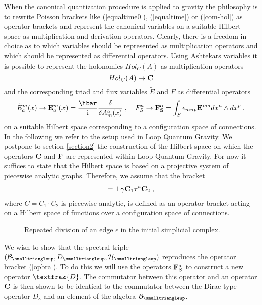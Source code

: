 \documentclass[12pt]{article}
\newcommand{\ba}{\begin{eqnarray}}
\newcommand{\ea}{\end{eqnarray}}
\def\d{\delta}
\def\e{\epsilon}
\def\t{\tau}
\def\cb{{\cal B}}
\def\ch{{\cal H}}
\begin{document}
When the canonical quantization procedure is applied to gravity the philosophy is to rewrite Poisson brackets like (\ref{equaltime0}), (\ref{equaltime}) or (\ref{com-hol}) as operator brackets and represent the canonical variables on a suitable Hilbert space as multiplication and derivation operators. Clearly, there is a freedom in choice as to which variables should be represented as multiplication operators and which should be represented as differential operators. 
Using Ashtekars variables it is possible to represent the holonomies $Hol_{C}(A)$ as multiplication operators $$Hol_C(A)\rightarrow{\bf C}$$ and the corresponding triad and flux variables $\tilde{E}$ and $F$ as differential operators
\ba 
\tilde{E}^m_a(x)\rightarrow {\bf E}^m_a(x)=\frac{\hbar}{\rm{i}}\frac{\d}{\d A^a_m(x)}\;,\quad F^a _S\rightarrow {\bf F^a_S}=\int_S \e_{mnp}{\bf E}^{ma} dx^n\wedge dx^p\;.
\label{mmm}
\ea
on a suitable Hilbert space corresponding to a configuration space of connections. In the following we refer to the setup used in Loop Quantum Gravity. We postpone to section \ref{section2} the construction of the Hilbert space on which the operators ${\bf C}$ and ${\bf F}$ are represented within Loop Quantum Gravity. For now it suffices to state that the Hilbert space is based on a projective system of piecewise analytic graphs. 
Therefore, we assume that the bracket
\ba
[{\bf F}^a_S,{\bf C}] = \pm\gamma {\bf C}_1\t^a {\bf C}_2\;,
\label{opbra}
\ea
where $C=C_1\cdot C_2$ is piecewise analytic, is defined as an operator bracket acting on a Hilbert space of functions over a configuration space of connections. 
\begin{figure} [t]
\begin{center}
 
\caption{Repeated division of an edge $\e$ in the initial simplicial complex.}
\label{simpII}
\end{center}
\end{figure}








We wish to show that the spectral triple $(\cb_{\smalltriangleup},D_{\smalltriangleup},\ch_\smalltriangleup)$ reproduces the operator bracket (\ref{opbra}). To do this we will use the operators ${\bf F}^a_S$ to construct a new operator $\textfrak{D}$. The commutator between this operator and an operator ${\bf C}$ is then shown to be identical to the commutator between the Dirac type operator $D_{\smalltriangleup}$ and an element of the algebra $\cb_{\smalltriangleup}$.
\end{document}

